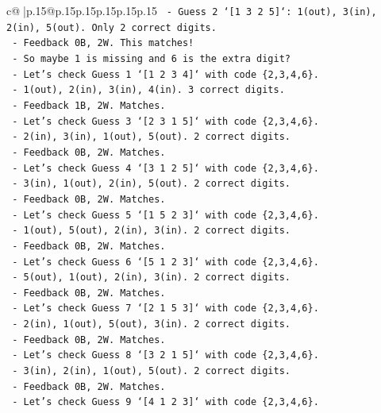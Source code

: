 \documentclass{article}
\begin{document}
{\begin{supertabular}{c@{$\;$}|p{.15\linewidth}@{}p{.15\linewidth}p{.15\linewidth}p{.15\linewidth}p{.15\linewidth}p{.15\linewidth}}
{{{\texttt{    {-} Guess 2 `{[}1 3 2 5{]}`: 1(out), 3(in), 2(in), 5(out). Only 2 correct digits.} \\
\texttt{    {-} Feedback 0B, 2W. This matches!} \\
\texttt{    {-} So maybe 1 is missing and 6 is the extra digit?} \\
\texttt{    {-} Let's check Guess 1 `{[}1 2 3 4{]}` with code \{2,3,4,6\}.} \\
\texttt{      {-} 1(out), 2(in), 3(in), 4(in). 3 correct digits.} \\
\texttt{      {-} Feedback 1B, 2W. Matches.} \\
\texttt{    {-} Let's check Guess 3 `{[}2 3 1 5{]}` with code \{2,3,4,6\}.} \\
\texttt{      {-} 2(in), 3(in), 1(out), 5(out). 2 correct digits.} \\
\texttt{      {-} Feedback 0B, 2W. Matches.} \\
\texttt{    {-} Let's check Guess 4 `{[}3 1 2 5{]}` with code \{2,3,4,6\}.} \\
\texttt{      {-} 3(in), 1(out), 2(in), 5(out). 2 correct digits.} \\
\texttt{      {-} Feedback 0B, 2W. Matches.} \\
\texttt{    {-} Let's check Guess 5 `{[}1 5 2 3{]}` with code \{2,3,4,6\}.} \\
\texttt{      {-} 1(out), 5(out), 2(in), 3(in). 2 correct digits.} \\
\texttt{      {-} Feedback 0B, 2W. Matches.} \\
\texttt{    {-} Let's check Guess 6 `{[}5 1 2 3{]}` with code \{2,3,4,6\}.} \\
\texttt{      {-} 5(out), 1(out), 2(in), 3(in). 2 correct digits.} \\
\texttt{      {-} Feedback 0B, 2W. Matches.} \\
\texttt{    {-} Let's check Guess 7 `{[}2 1 5 3{]}` with code \{2,3,4,6\}.} \\
\texttt{      {-} 2(in), 1(out), 5(out), 3(in). 2 correct digits.} \\
\texttt{      {-} Feedback 0B, 2W. Matches.} \\
\texttt{    {-} Let's check Guess 8 `{[}3 2 1 5{]}` with code \{2,3,4,6\}.} \\
\texttt{      {-} 3(in), 2(in), 1(out), 5(out). 2 correct digits.} \\
\texttt{      {-} Feedback 0B, 2W. Matches.} \\
\texttt{    {-} Let's check Guess 9 `{[}4 1 2 3{]}` with code \{2,3,4,6\}.} \\
}}}
\end{supertabular}}
\end{document}
